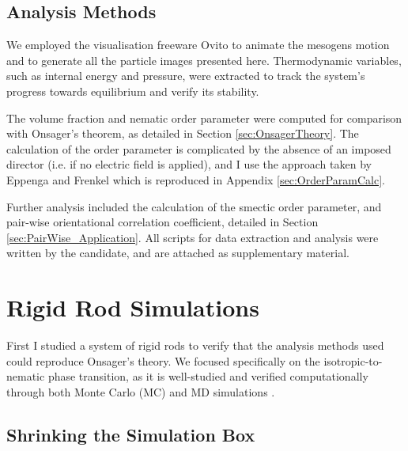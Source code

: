 \documentclass[11pt, a4paper]{article} %
\begin{document}
 
\subsection{Analysis Methods}
We employed the visualisation freeware Ovito \cite{Ovito} to animate the mesogens motion and to generate all the particle images presented here. Thermodynamic variables, such as internal energy and pressure, were extracted to track the system's progress towards equilibrium and verify its stability.

The volume fraction and nematic order parameter were computed for comparison with Onsager's theorem, as detailed in Section \ref{sec:OnsagerTheory}. The calculation of the order parameter is complicated by the absence of an imposed director (i.e. if no electric field is applied), and I use the approach taken by Eppenga and Frenkel \cite{Eppenga1984} which is reproduced in Appendix \ref{sec:OrderParamCalc}.

Further analysis included the calculation of the smectic order parameter, and pair-wise orientational correlation coefficient, detailed in Section \ref{sec:PairWise_Application}. All scripts for data extraction and analysis were written by the candidate, and are attached as supplementary material.



\section{Rigid Rod Simulations} \label{sec:RigidRodSims}

First I studied a system of rigid rods to verify that the analysis methods used could reproduce Onsager's theory. We focused specifically on the isotropic-to-nematic phase transition, as it is well-studied and verified computationally through both Monte Carlo (MC) \cite{Frenkel1984, Lee1987} and MD simulations \cite{Allen1987, Camp1996}.


\subsection{Shrinking the Simulation Box}
\end{document}
